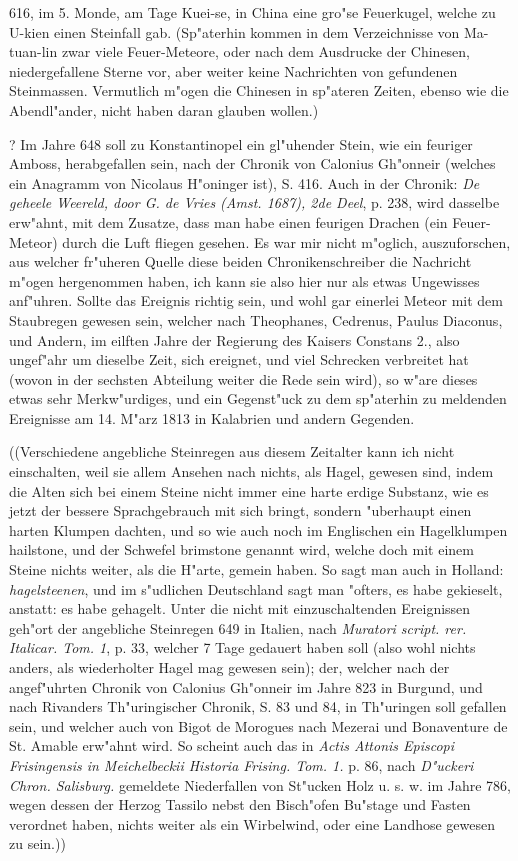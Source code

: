 \documentclass[a4paper, 11pt, oneside, polutonikogreek, german]{article}
\begin{document}
616, im 5. Monde, am Tage Kuei-se, in China eine gro"se Feuerkugel, welche zu U-kien einen Steinfall gab. (Sp"aterhin kommen in dem Verzeichnisse von Ma-tuan-lin zwar viele Feuer-Meteore, oder nach dem Ausdrucke der Chinesen, niedergefallene Sterne vor, aber weiter keine Nachrichten von gefundenen Steinmassen. Vermutlich m"ogen die Chinesen in sp"ateren Zeiten, ebenso wie die Abendl"ander, nicht haben daran glauben wollen.)

? Im Jahre 648 soll zu Konstantinopel ein gl"uhender Stein, wie ein feuriger Amboss, herabgefallen sein, nach der Chronik von Calonius Gh"onneir (welches ein Anagramm von Nicolaus H"oninger ist), S. 416. Auch in der Chronik: \emph{De geheele Weereld, door G. de Vries (Amst. 1687), 2de Deel}, p. 238, wird dasselbe erw"ahnt, mit dem Zusatze, dass man habe einen feurigen Drachen (ein Feuer-Meteor) durch die Luft fliegen gesehen. Es war mir nicht m"oglich, auszuforschen, aus welcher fr"uheren Quelle diese beiden Chronikenschreiber die Nachricht m"ogen hergenommen haben, ich kann sie also hier nur als etwas Ungewisses anf"uhren. Sollte das Ereignis richtig sein, und wohl gar einerlei Meteor mit dem Staubregen gewesen sein, welcher nach Theophanes, Cedrenus, Paulus Diaconus, und Andern, im eilften Jahre der Regierung des Kaisers Constans 2., also ungef"ahr um dieselbe Zeit, sich ereignet, und viel Schrecken verbreitet hat (wovon in der sechsten Abteilung weiter die Rede sein wird), so w"are dieses etwas sehr Merkw"urdiges, und ein Gegenst"uck zu dem sp"aterhin zu meldenden Ereignisse am 14. M"arz 1813 in Kalabrien und andern Gegenden.

((Verschiedene angebliche Steinregen aus diesem Zeitalter kann ich nicht einschalten, weil sie allem Ansehen nach nichts, als Hagel, gewesen sind, indem die Alten sich bei einem Steine nicht immer eine harte erdige Substanz, wie es jetzt der bessere Sprachgebrauch mit sich bringt, sondern "uberhaupt einen harten Klumpen dachten, und so wie auch noch im Englischen ein Hagelklumpen hailstone, und der Schwefel brimstone genannt wird, welche doch mit einem Steine nichts weiter, als die H"arte, gemein haben. So sagt man auch in Holland: \emph{hagelsteenen}, und im s"udlichen Deutschland sagt man "ofters, es habe gekieselt, anstatt: es habe gehagelt. Unter die nicht mit einzuschaltenden Ereignissen geh"ort der angebliche Steinregen 649 in Italien, nach \emph{Muratori script. rer. Italicar. Tom. 1}, p. 33, welcher 7 Tage gedauert haben soll (also wohl nichts anders, als wiederholter Hagel mag gewesen sein); der, welcher nach der angef"uhrten Chronik von Calonius Gh"onneir im Jahre 823 in Burgund, und nach Rivanders Th"uringischer Chronik, S. 83 und 84, in Th"uringen soll gefallen sein, und welcher auch von Bigot de Morogues nach Mezerai und Bonaventure de St. Amable erw"ahnt wird. So scheint auch das in \emph{Actis Attonis Episcopi Frisingensis in Meichelbeckii Historia Frising. Tom. 1.} p. 86, nach \emph{D"uckeri Chron. Salisburg.} gemeldete Niederfallen von St"ucken Holz u. s. w. im Jahre 786, wegen dessen der Herzog Tassilo nebst den Bisch"ofen Bu"stage und Fasten verordnet haben, nichts weiter als ein Wirbelwind, oder eine Landhose gewesen zu sein.))
\end{document}
